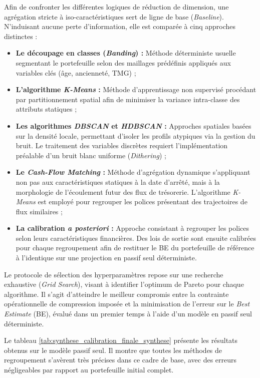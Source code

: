 Afin de confronter les différentes logiques de réduction de dimension, une agrégation stricte à iso-caractéristiques sert de ligne de base (\textit{Baseline}). N'induisant aucune perte d'information, elle est comparée à cinq approches distinctes :
\begin{itemize}
    \item \textbf{Le découpage en classes (\textit{Banding}) :} Méthode déterministe usuelle segmentant le portefeuille selon des maillages prédéfinis appliqués aux variables clés (âge, ancienneté, TMG) ;
    \item \textbf{L'algorithme \textit{K-Means} :} Méthode d'apprentissage non supervisé procédant par partitionnement spatial afin de minimiser la variance intra-classe des attributs statiques ;
    \item \textbf{Les algorithmes \textit{DBSCAN} et \textit{HDBSCAN} :} Approches spatiales basées sur la densité locale, permettant d'isoler les profils atypiques via la gestion du bruit. Le traitement des variables discrètes requiert l'implémentation préalable d'un bruit blanc uniforme (\textit{Dithering}) ;
    \item \textbf{Le \textit{Cash-Flow Matching} :} Méthode d'agrégation dynamique s'appliquant non pas aux caractéristiques statiques à la date d'arrêté, mais à la morphologie de l'écoulement futur des flux de trésorerie. L'algorithme \textit{K-Means} est employé pour regrouper les polices présentant des trajectoires de flux similaires ;
    \item \textbf{La calibration \textit{a posteriori} :} Approche consistant à regrouper les polices selon leurs caractéristiques financières. Des lois de sortie sont ensuite calibrées pour chaque regroupement afin de restituer le BE du portefeuille de référence à l'identique sur une projection en passif seul déterministe.
\end{itemize}

Le protocole de sélection des hyperparamètres repose sur une recherche exhaustive (\textit{Grid Search}), visant à identifier l'optimum de Pareto pour chaque algorithme. Il s'agit d'atteindre le meilleur compromis entre la contrainte opérationnelle de compression imposée et la minimisation de l'erreur sur le \textit{Best Estimate} (BE), évalué dans un premier temps à l'aide d'un modèle en passif seul déterministe. 

Le tableau \ref{tab:synthese_calibration_finale_synthese} présente les résultats obtenus sur le modèle passif seul. Il montre que toutes les méthodes de regroupement s'avèrent très précises dans ce cadre de base, avec des erreurs négligeables par rapport au portefeuille initial complet.

